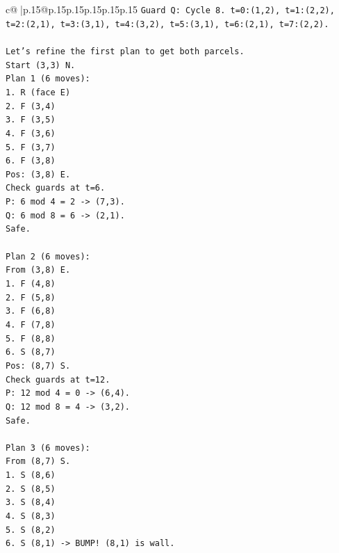 \documentclass{article}
\begin{document}
{\begin{supertabular}{c@{$\;$}|p{.15\linewidth}@{}p{.15\linewidth}p{.15\linewidth}p{.15\linewidth}p{.15\linewidth}p{.15\linewidth}}
{{{\texttt{Guard Q: Cycle 8. t=0:(1,2), t=1:(2,2), t=2:(2,1), t=3:(3,1), t=4:(3,2), t=5:(3,1), t=6:(2,1), t=7:(2,2).} \\
\\ 
\texttt{Let's refine the first plan to get both parcels.} \\
\texttt{Start (3,3) N.} \\
\texttt{Plan 1 (6 moves):} \\
\texttt{1. R (face E)} \\
\texttt{2. F (3,4)} \\
\texttt{3. F (3,5)} \\
\texttt{4. F (3,6)} \\
\texttt{5. F (3,7)} \\
\texttt{6. F (3,8)} \\
\texttt{Pos: (3,8) E.} \\
\texttt{Check guards at t=6.} \\
\texttt{P: 6 mod 4 = 2 {-}> (7,3).} \\
\texttt{Q: 6 mod 8 = 6 {-}> (2,1).} \\
\texttt{Safe.} \\
\\ 
\texttt{Plan 2 (6 moves):} \\
\texttt{From (3,8) E.} \\
\texttt{1. F (4,8)} \\
\texttt{2. F (5,8)} \\
\texttt{3. F (6,8)} \\
\texttt{4. F (7,8)} \\
\texttt{5. F (8,8)} \\
\texttt{6. S (8,7)} \\
\texttt{Pos: (8,7) S.} \\
\texttt{Check guards at t=12.} \\
\texttt{P: 12 mod 4 = 0 {-}> (6,4).} \\
\texttt{Q: 12 mod 8 = 4 {-}> (3,2).} \\
\texttt{Safe.} \\
\\ 
\texttt{Plan 3 (6 moves):} \\
\texttt{From (8,7) S.} \\
\texttt{1. S (8,6)} \\
\texttt{2. S (8,5)} \\
\texttt{3. S (8,4)} \\
\texttt{4. S (8,3)} \\
\texttt{5. S (8,2)} \\
\texttt{6. S (8,1) {-}> BUMP! (8,1) is wall.} \\
}}}
\end{supertabular}}
\end{document}
